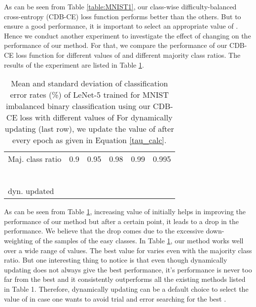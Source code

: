 \documentclass[runningheads]{llncs}
\begin{document}
As can be seen from Table \ref{table:MNIST1}, our class-wise difficulty-balanced cross-entropy
(CDB-CE) loss function performs better than the others. But to ensure a good 
performance, it is important to select an appropriate value of . Hence we 
conduct another experiment to investigate the effect of changing  on the 
performance of our
method. For that, we compare the performance of our CDB-CE loss function for 
different values of  and different majority class ratios. The results of 
the experiment
are listed in Table \ref{table:MNIST2}.

\setlength{\tabcolsep}{4pt}
\begin{table}[t!]
\begin{center}
\caption{
Mean and standard deviation of classification error rates (\%) of LeNet-5 
\cite{LeNet} trained
for MNIST imbalanced binary classification using our CDB-CE loss with different values of 
For dynamically updating  (last row), we update the value of  after every epoch as given in Equation \ref{tau_calc}.}
\label{table:MNIST2}
\begin{tabular}{llllll}
\hline\noalign{\smallskip}
Maj. class ratio & 0.9 & 0.95 & 0.98 & 0.99 & 0.995\\
\noalign{\smallskip}
\hline
\noalign{\smallskip}
 & &  &  &  & \\
 & &  &  &  & \\
 & &  &  &  & \\
 & &  &  &  & \\
 & &  &  &  & \\
 & &  &  &  & \\
dyn. updated  & &  &  &  & \\
\hline
\end{tabular}
\end{center}
\end{table}
\setlength{\tabcolsep}{1.4pt}


As can be seen from Table \ref{table:MNIST2}, increasing value of  initially helps in 
improving the performance of our method but after a certain point, it leads to a 
drop in the performance. We believe that the drop comes due to the excessive 
down-weighting of the samples of the easy classes. In Table \ref{table:MNIST2}, our method works 
well over a wide range of  values. The best value for  varies even 
with the majority class ratio. But one interesting thing to notice is that even 
though dynamically updating  does not always give
the best performance, it’s performance is never too far from the best and it 
consistently outperforms all the existing methods listed in Table 1. Therefore, 
dynamically updating  can be a default choice to select the value of  in case one wants to avoid trial and error searching for the best .
\end{document}
